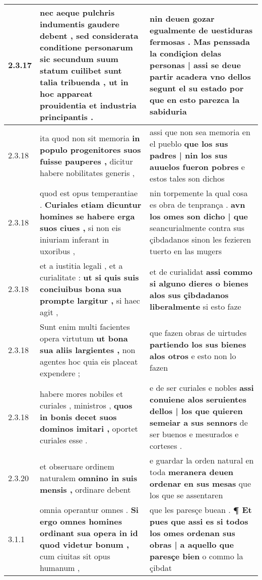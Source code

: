 \begin{tabular}{|p{1cm}|p{6.5cm}|p{6.5cm}|}
2.3.17 & nec aeque pulchris indumentis gaudere debent , \textbf{ sed considerata conditione personarum sic secundum suum statum cuilibet sunt talia tribuenda , } ut in hoc appareat prouidentia et industria principantis . & nin deuen gozar egualmente de uestiduras fermosas . \textbf{ Mas penssada la condiçion delas personas | assi se deue partir acadera vno dellos segunt el su estado } por que en esto parezca la sabiduria \\\hline
2.3.18 & ita quod non sit memoria \textbf{ in populo progenitores suos fuisse pauperes , } dicitur habere nobilitates generis , & assi que non sea memoria en el pueblo \textbf{ que los sus padres | nin los sus auuelos fueron pobres } e estos tales son dichos \\\hline
2.3.18 & quod est opus temperantiae . \textbf{ Curiales etiam dicuntur homines se habere erga suos ciues , } si non eis iniuriam inferant in uxoribus , & nin torpemente la qual cosa es obra de tenprança . \textbf{ avn los omes son dicho | que } seancurialmente contra sus çibdadanos sinon les fezieren tuerto en las mugers \\\hline
2.3.18 & et a iustitia legali , et a curialitate : \textbf{ ut si quis suis conciuibus bona sua prompte largitur , } si haec agit , & et de curialidat \textbf{ assi commo si alguno dieres o bienes alos sus çibdadanos liberalmente } si esto faze \\\hline
2.3.18 & Sunt enim multi facientes opera virtutum \textbf{ ut bona sua aliis largientes , } non agentes hoc quia eis placeat expendere ; & que fazen obras de uirtudes \textbf{ partiendo los sus bienes alos otros } e esto non lo fazen \\\hline
2.3.18 & habere mores nobiles et curiales , ministros , \textbf{ quos in bonis decet suos dominos imitari , } oportet curiales esse . & e de ser curiales e nobles \textbf{ assi conuiene alos seruientes dellos | los que quieren semeiar a sus sennors } de ser buenos e mesurados e corteses . \\\hline
2.3.20 & et obseruare ordinem naturalem \textbf{ omnino in suis mensis , } ordinare debent & e guardar la orden natural en toda \textbf{ meranera deuen ordenar en sus mesas } que los que se assentaren \\\hline
3.1.1 & omnia operantur omnes . \textbf{ Si ergo omnes homines ordinant sua opera in id quod videtur bonum , } cum ciuitas sit opus humanum , & que les paresçe buean . \textbf{ ¶ Et pues que assi es si todos los omes ordenan sus obras | a aquello que paresçe bien } o commo la çibdat \\\hline

\end{tabular}
